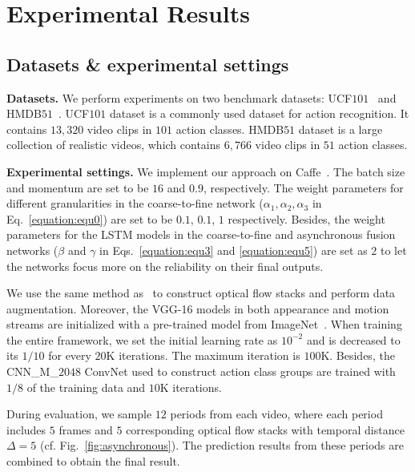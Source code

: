 \documentclass[letterpaper]{article} %
\begin{document}
\section{Experimental Results\label{section:experimental evaluation}}

\subsection{Datasets \& experimental settings}\label{Datasets_experimental settings}

{\bf Datasets.} We perform experiments on two benchmark datasets: UCF$101$~\cite{ucf101} and HMDB$51$~\cite{hmdb51}. UCF$101$ dataset is a commonly used dataset for action recognition. It contains $13,320$ video clips in $101$ action classes. HMDB$51$ dataset is a large collection of realistic videos, which contains $6,766$ video clips in $51$ action classes.


{\bf Experimental settings.} We implement our approach on Caffe~\cite{caffe}. The batch size and momentum are set to be $16$ and $0.9$, respectively. The weight parameters for different granularities in the coarse-to-fine network ($\alpha_1,\alpha_2,\alpha_3$ in Eq.~\ref{equation:equ0}) are set to be $0.1$, $0.1$, $1$ respectively. Besides, the weight parameters for the LSTM models in the coarse-to-fine and asynchronous fusion networks ($\beta$ and $\gamma$ in Eqs.~\ref{equation:equ3} and \ref{equation:equ5}) are set as $2$ to let the networks focus more on the reliability on their final outputs.


We use the same method as~\cite{TSN,TDDIDT,transform} to construct optical flow stacks and perform data augmentation. Moreover, the VGG-16 models in both appearance and motion streams are initialized with a pre-trained model from ImageNet~\cite{ImageNet}. When training the entire framework, we set the initial learning rate as $10^{-2}$ and is decreased to its $1/10$ for every $20$K iterations. The maximum iteration is $100$K. Besides, the CNN\_M\_$2048$ ConvNet used to construct action class groups are trained with $1/8$ of the training data and $10$K iterations.

During evaluation, we sample $12$ periods from each video, where each period includes $5$ frames and $5$ corresponding optical flow stacks with temporal distance $\Delta=5$ (cf. Fig.~\ref{fig:asynchronous}). The prediction results from these periods are combined to obtain the final result.
\end{document}
